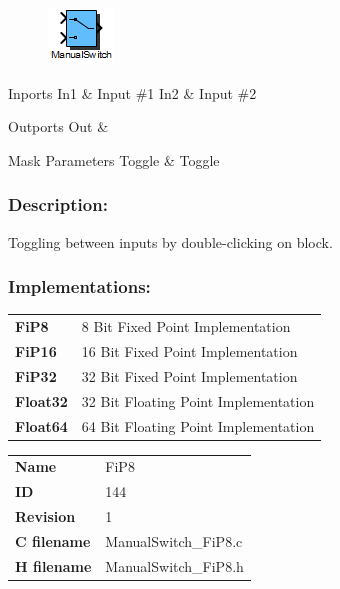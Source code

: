 \label{block:ManualSwitch}
\begin{figure}[H]\includegraphics{ManualSwitch}\end{figure} 

\begin{XtoCtabular}{Inports}
In1 & Input \#1\tabularnewline
\hline
In2 & Input \#2\tabularnewline
\hline
\end{XtoCtabular}


\begin{XtoCtabular}{Outports}
Out & \tabularnewline
\hline
\end{XtoCtabular}

\begin{XtoCtabular}{Mask Parameters}
Toggle & Toggle\tabularnewline
\hline
\end{XtoCtabular}

\subsubsection*{Description:}
Toggling between inputs by double-clicking on block.


\subsubsection*{Implementations:}
\begin{tabular}{l l}
\textbf{FiP8} & 8 Bit Fixed Point Implementation\tabularnewline
\textbf{FiP16} & 16 Bit Fixed Point Implementation\tabularnewline
\textbf{FiP32} & 32 Bit Fixed Point Implementation\tabularnewline
\textbf{Float32} & 32 Bit Floating Point Implementation\tabularnewline
\textbf{Float64} & 64 Bit Floating Point Implementation\tabularnewline
\end{tabular}

\nopagebreak[0]
\begin{tabular}{l l}
\textbf{Name} & FiP8 \tabularnewline
\textbf{ID} & 144 \tabularnewline
\textbf{Revision} & 1 \tabularnewline
\textbf{C filename} & ManualSwitch\_FiP8.c \tabularnewline
\textbf{H filename} & ManualSwitch\_FiP8.h \tabularnewline
\end{tabular}
\vspace{1ex}

